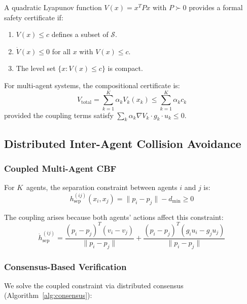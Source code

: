 \documentclass[11pt,twocolumn]{article}
\theoremstyle{definition}
\newcommand{\cS}{\mathcal{S}}
\begin{document}
A quadratic Lyapunov function $V(x) = x^T P x$ with $P \succ 0$ provides a formal safety certificate if:
\begin{enumerate}[leftmargin=*]
    \item $V(x) \leq c$ defines a subset of $\cS$.
    \item $\dot{V}(x) \leq 0$ for all $x$ with $V(x) \leq c$.
    \item The level set $\{x : V(x) \leq c\}$ is compact.
\end{enumerate}

For multi-agent systems, the compositional certificate is:
\begin{equation}
V_{\text{total}} = \sum_{k=1}^{K} \alpha_k V_k(x_k) \leq \sum_{k=1}^{K} \alpha_k c_k
\end{equation}
provided the coupling terms satisfy $\sum_k \alpha_k \nabla V_k \cdot g_k \cdot u_k \leq 0$.

\subsection{Distributed Inter-Agent Collision Avoidance}
\label{sec:collision_avoidance}

\subsubsection{Coupled Multi-Agent CBF}

For $K$~agents, the separation constraint between agents $i$ and $j$ is:
\begin{equation}
h_{\text{sep}}^{(ij)}(x_i, x_j) = \|p_i - p_j\| - d_{\min} \geq 0
\end{equation}

The coupling arises because both agents' actions affect this constraint:
\begin{equation}
\dot{h}_{\text{sep}}^{(ij)} = \frac{(p_i - p_j)^T(v_i - v_j)}{\|p_i - p_j\|} + \frac{(p_i - p_j)^T(g_i u_i - g_j u_j)}{\|p_i - p_j\|}
\end{equation}

\subsubsection{Consensus-Based Verification}

We solve the coupled constraint via distributed consensus (Algorithm~\ref{alg:consensus}):
\end{document}
